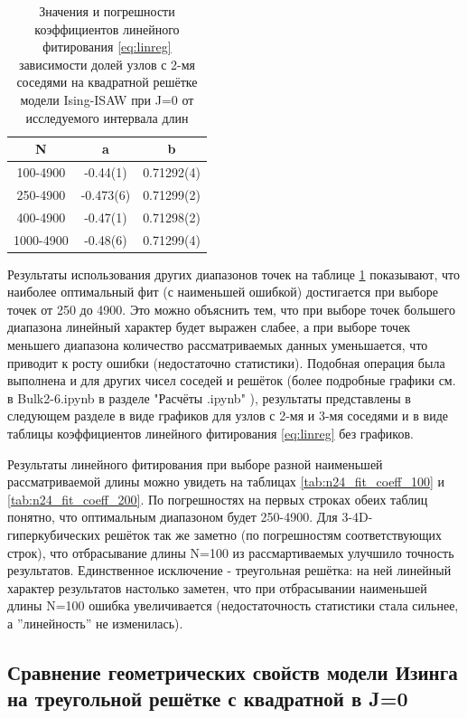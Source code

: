 \begin{table}[h]
    \centering
    \begin{tabular}{|c|c|c|} \hline
        N & a & b  \\ \hline
        100-4900 & -0.44(1) & 0.71292(4) \\ \hline
        250-4900 & -0.473(6) & 0.71299(2) \\ \hline
        400-4900 & -0.47(1) & 0.71298(2) \\ \hline
        1000-4900 & -0.48(6) & 0.71299(4) \\ \hline
    \end{tabular}
    \caption{Значения и погрешности коэффициентов линейного фитирования \eqref{eq:linreg} зависимости долей узлов с 2-мя соседями на квадратной решётке модели Ising-ISAW при J=0 от исследуемого интервала длин}
    \label{tab:a_b_n2_square}
\end{table}

Результаты использования других диапазонов точек на таблице \ref{tab:a_b_n2_square} показывают, что наиболее оптимальный фит (с наименьшей ошибкой) достигается при выборе точек от 250 до 4900. Это можно объяснить тем, что при выборе точек большего диапазона линейный характер будет выражен слабее, а при выборе точек меньшего диапазона количество рассматриваемых данных уменьшается, что приводит к росту ошибки (недостаточно статистики). Подобная операция была выполнена и для других чисел соседей и решёток (более подробные графики см. в Bulk2-6.ipynb в разделе "Расчёты .ipynb" \cite{web:ProjectMagnetRepos}), результаты представлены в следующем разделе в виде графиков для узлов с 2-мя и 3-мя соседями и в виде таблицы коэффициентов линейного фитирования \eqref{eq:linreg} без графиков. 

Результаты линейного фитирования при выборе разной наименьшей рассматриваемой длины можно увидеть на таблицах \ref{tab:n24_fit_coeff_100} и \ref{tab:n24_fit_coeff_200}. По погрешностях на первых строках обеих таблиц понятно, что оптимальным диапазоном будет 250-4900. Для 3-4D-гиперкубических решёток так же заметно (по погрешностям соответствующих строк), что отбрасывание длины N=100 из рассмартиваемых улучшило точность результатов. Единственное исключение - треугольная решётка: на ней линейный характер результатов настолько заметен, что при отбрасывании наименьшей длины N=100 ошибка увеличивается (недостаточность статистики стала сильнее, а ''линейность'' не изменилась).

\newpage

\subsection{Сравнение геометрических свойств модели Изинга на треугольной решётке с квадратной в J=0}

